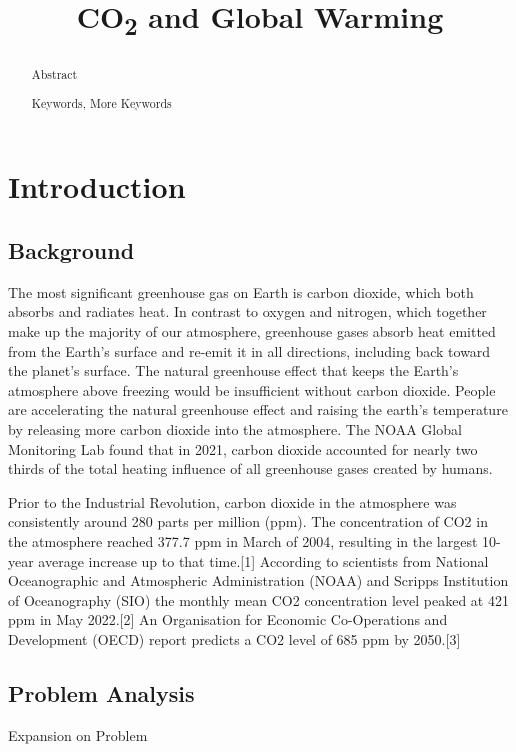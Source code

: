 \documentclass{mcmthesis}
\title{CO\textsubscript{2} and Global Warming}
\begin{document}
    \begin{abstract}
        Abstract

        \begin{keywords}
            Keywords, More Keywords
        \end{keywords}

    \end{abstract}

    \maketitle
    \tableofcontents
    \newpage


    \section{Introduction}

    \subsection{Background}
    The most significant greenhouse gas on Earth is carbon dioxide, which both absorbs and radiates heat. In contrast to oxygen and nitrogen, which together make up the majority of our atmosphere, greenhouse gases absorb heat emitted from the Earth's surface and re-emit it in all directions, including back toward the planet's surface. The natural greenhouse effect that keeps the Earth's atmosphere above freezing would be insufficient without carbon dioxide. People are accelerating the natural greenhouse effect and raising the earth's temperature by releasing more carbon dioxide into the atmosphere. The NOAA Global Monitoring Lab found that in 2021, carbon dioxide accounted for nearly two thirds of the total heating influence of all greenhouse gases created by humans.

    Prior to the Industrial Revolution, carbon dioxide in the atmosphere was consistently around 280 parts per million (ppm).
    The concentration of CO2 in the atmosphere reached 377.7 ppm
    in March of 2004, resulting in the largest 10-year average
    increase up to that time.[1] According to scientists from National
    Oceanographic and Atmospheric Administration (NOAA) and
    Scripps Institution of Oceanography (SIO) the monthly mean
    CO2 concentration level peaked at 421 ppm in May 2022.[2] An
    Organisation for Economic Co-Operations and Development
    (OECD) report predicts a CO2 level of 685 ppm by 2050.[3]


    \subsection{Problem Analysis}
    Expansion on Problem
\end{document}
